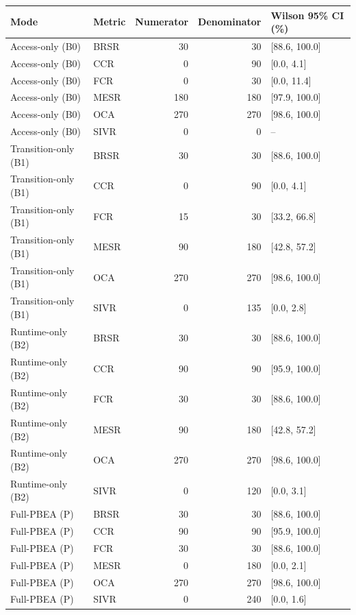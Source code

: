 \begin{tabular}{llrrl}
\toprule
Mode & Metric & Numerator & Denominator & Wilson 95\% CI (\%) \\
\midrule
Access-only (B0) & BRSR & 30 & 30 & [88.6, 100.0] \\
Access-only (B0) & CCR & 0 & 90 & [0.0, 4.1] \\
Access-only (B0) & FCR & 0 & 30 & [0.0, 11.4] \\
Access-only (B0) & MESR & 180 & 180 & [97.9, 100.0] \\
Access-only (B0) & OCA & 270 & 270 & [98.6, 100.0] \\
Access-only (B0) & SIVR & 0 & 0 & -- \\
Transition-only (B1) & BRSR & 30 & 30 & [88.6, 100.0] \\
Transition-only (B1) & CCR & 0 & 90 & [0.0, 4.1] \\
Transition-only (B1) & FCR & 15 & 30 & [33.2, 66.8] \\
Transition-only (B1) & MESR & 90 & 180 & [42.8, 57.2] \\
Transition-only (B1) & OCA & 270 & 270 & [98.6, 100.0] \\
Transition-only (B1) & SIVR & 0 & 135 & [0.0, 2.8] \\
Runtime-only (B2) & BRSR & 30 & 30 & [88.6, 100.0] \\
Runtime-only (B2) & CCR & 90 & 90 & [95.9, 100.0] \\
Runtime-only (B2) & FCR & 30 & 30 & [88.6, 100.0] \\
Runtime-only (B2) & MESR & 90 & 180 & [42.8, 57.2] \\
Runtime-only (B2) & OCA & 270 & 270 & [98.6, 100.0] \\
Runtime-only (B2) & SIVR & 0 & 120 & [0.0, 3.1] \\
Full-PBEA (P) & BRSR & 30 & 30 & [88.6, 100.0] \\
Full-PBEA (P) & CCR & 90 & 90 & [95.9, 100.0] \\
Full-PBEA (P) & FCR & 30 & 30 & [88.6, 100.0] \\
Full-PBEA (P) & MESR & 0 & 180 & [0.0, 2.1] \\
Full-PBEA (P) & OCA & 270 & 270 & [98.6, 100.0] \\
Full-PBEA (P) & SIVR & 0 & 240 & [0.0, 1.6] \\
\bottomrule
\end{tabular}
